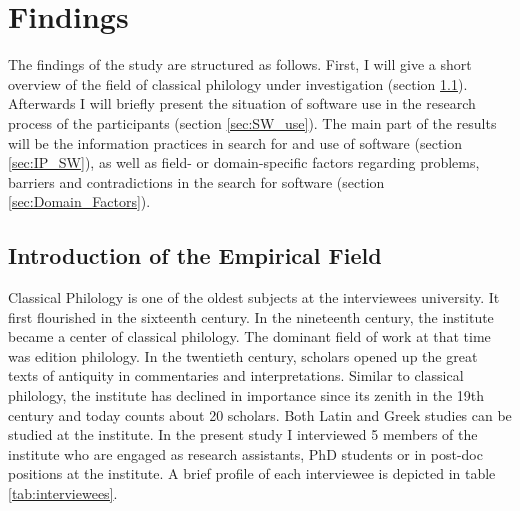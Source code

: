 \documentclass[12pt, a4paper, titlepage, oneside, abstract=true, toc=listof, toc=bibliography, BCOR=1cm]{scrreprt}
\begin{document}
	
\chapter{Findings}
\label{sec:findings}
The findings of the study are structured as follows. First, I will give a short overview of the field of classical philology under investigation (section \ref{sec:introduction_field}). Afterwards I will briefly present the situation of software use in the research process of the participants (section \ref{sec:SW_use}). The main part of the results will be the information practices in search for and use of software (section \ref{sec:IP_SW}), as well as field- or domain-specific factors regarding problems, barriers and contradictions in the search for software (section \ref{sec:Domain_Factors}).

\section{Introduction of the Empirical Field}
\label{sec:introduction_field}
Classical Philology is one of the oldest subjects at the interviewees university. It first flourished in the sixteenth century. In the nineteenth century, the institute became a center of classical phi\-lo\-lo\-gy. The dominant field of work at that time was edition philology. In the twentieth century, scholars opened up the great texts of anti\-qui\-ty in commentaries and interpretations. Similar to classical philology, the institute has declined in importance since its zenith in the 19th century and today counts about 20 scholars. Both Latin and Greek studies can be studied at the institute.
In the present study I interviewed 5 members of the institute who are engaged as research assistants, PhD students or in post-doc positions at the institute. A brief profile of each interviewee is depicted in table \ref{tab:interviewees}. 
\end{document}
